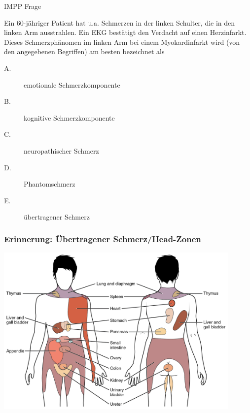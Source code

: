 \documentclass{beamer}
\begin{document}



\begin{frame}{IMPP Frage}


Ein 60-jähriger Patient hat u.a. Schmerzen in der linken Schulter, die in den linken Arm ausstrahlen. Ein EKG bestätigt den Verdacht auf einen Herzinfarkt. Dieses Schmerzphänomen im linken Arm bei einem Myokardinfarkt wird (von den angegebenen Begriffen) am besten bezeichnet als 

\begin{description}
    \item[A.] emotionale Schmerzkomponente
    \item[B.] kognitive Schmerzkomponente
    \item[C.] neuropathischer Schmerz
    \item[D.] Phantomschmerz
    \item[E.] übertragener Schmerz
\end{description}
    
\end{frame}

\begin{frame}
\frametitle{Erinnerung: Übertragener Schmerz/Head-Zonen}



\begin{center}
\includegraphics[width=0.9\textwidth]{Referred_Pain_Chart.jpg}
\end{center}

\end{frame}



\end{document}
